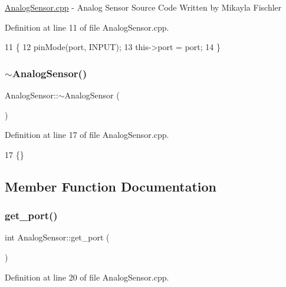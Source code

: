 \hyperlink{_analog_sensor_8cpp}{Analog\+Sensor.\+cpp} -\/ Analog Sensor Source Code Written by Mikayla Fischler 

Definition at line 11 of file Analog\+Sensor.\+cpp.


\begin{DoxyCode}
11                                    \{
12     pinMode(port, INPUT);
13     this->port = port;
14 \}
\end{DoxyCode}
\mbox{\label{class_analog_sensor_a4b88bf9ee03c180dedea7822e5d32997}} 
\subsubsection{\texorpdfstring{$\sim$\+Analog\+Sensor()}{~AnalogSensor()}}
{\footnotesize\ttfamily Analog\+Sensor\+::$\sim$\+Analog\+Sensor (\begin{DoxyParamCaption}{ }\end{DoxyParamCaption})}



Definition at line 17 of file Analog\+Sensor.\+cpp.


\begin{DoxyCode}
17 \{\}
\end{DoxyCode}


\subsection{Member Function Documentation}
\mbox{\label{class_analog_sensor_ac1b3abc06cdff820a1c0e56ba064495e}} 
\subsubsection{\texorpdfstring{get\+\_\+port()}{get\_port()}}
{\footnotesize\ttfamily int Analog\+Sensor\+::get\+\_\+port (\begin{DoxyParamCaption}{ }\end{DoxyParamCaption})}



Definition at line 20 of file Analog\+Sensor.\+cpp.


